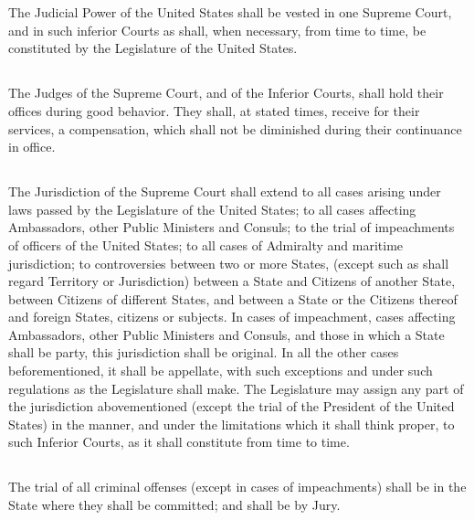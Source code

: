 \documentclass{constitution}
\begin{document}
\chapter{}
\section{}
The Judicial Power of the United States shall be vested in one Supreme Court,
and in such inferior Courts as shall, when necessary, from time to time,
be constituted by the Legislature of the United States.

\section{}
The Judges of the Supreme Court, and of the Inferior Courts, shall hold their offices during good behavior.
They shall, at stated times, receive for their services, a compensation,
which shall not be diminished during their continuance in office.

\section{}
The Jurisdiction of the Supreme Court shall extend
to all cases arising under laws passed by the Legislature of the United States;
to all cases affecting Ambassadors, other Public Ministers and Consuls;
to the trial of impeachments of officers of the United States;
to all cases of Admiralty and maritime jurisdiction;
to controversies between two or more States,
(except such as shall regard Territory or Jurisdiction)
between a State and Citizens of another State, between Citizens of different States, and between a State or the Citizens thereof and foreign States, citizens or subjects.
In cases of impeachment, cases affecting Ambassadors, other Public Ministers and Consuls, and those in which a State shall be party,
this jurisdiction shall be original.
In all the other cases beforementioned,
it shall be appellate,
with such exceptions and under such regulations as the Legislature shall make.
The Legislature may assign any part of the jurisdiction abovementioned
(except the trial of the President of the United States)
in the manner, and under the limitations which it shall think proper,
to such Inferior Courts, as it shall constitute from time to time.

\section{}
The trial of all criminal offenses (except in cases of impeachments) shall be in the State where they shall be committed;
and shall be by Jury.
\end{document}
